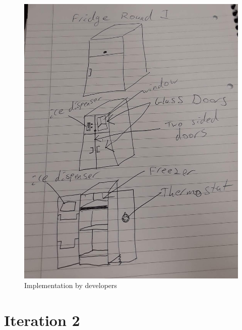 \documentclass[12pt]{article}
\begin{document}
\begin{figure}[!htb]
    \includegraphics[width=\linewidth]{iteration-1-fridge.png}
    \caption{Implementation by developers}
\end{figure}

\newpage

\section{Iteration 2}
\end{document}

